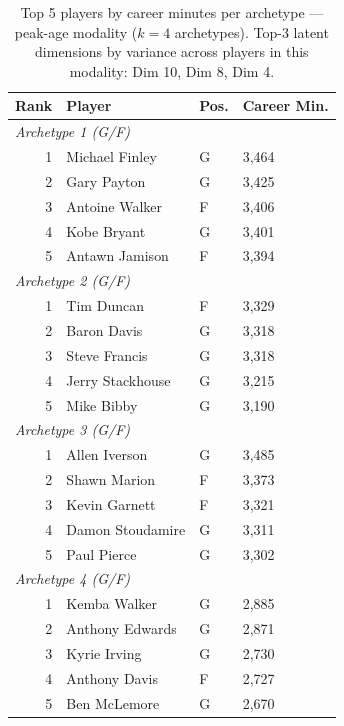 \begin{table}[htbp]
  \centering\small
  \begin{tabular}{rlll}
    \toprule
    Rank & Player & Pos. & Career Min. \\
    \midrule
    \multicolumn{4}{l}{\textit{Archetype 1 (G/F)}} \\
    \midrule
    1 & Michael Finley & G & 3,464 \\
    2 & Gary Payton & G & 3,425 \\
    3 & Antoine Walker & F & 3,406 \\
    4 & Kobe Bryant & G & 3,401 \\
    5 & Antawn Jamison & F & 3,394 \\
    \midrule[0.4pt]
    \multicolumn{4}{l}{\textit{Archetype 2 (G/F)}} \\
    \midrule
    1 & Tim Duncan & F & 3,329 \\
    2 & Baron Davis & G & 3,318 \\
    3 & Steve Francis & G & 3,318 \\
    4 & Jerry Stackhouse & G & 3,215 \\
    5 & Mike Bibby & G & 3,190 \\
    \midrule[0.4pt]
    \multicolumn{4}{l}{\textit{Archetype 3 (G/F)}} \\
    \midrule
    1 & Allen Iverson & G & 3,485 \\
    2 & Shawn Marion & F & 3,373 \\
    3 & Kevin Garnett & F & 3,321 \\
    4 & Damon Stoudamire & G & 3,311 \\
    5 & Paul Pierce & G & 3,302 \\
    \midrule[0.4pt]
    \multicolumn{4}{l}{\textit{Archetype 4 (G/F)}} \\
    \midrule
    1 & Kemba Walker & G & 2,885 \\
    2 & Anthony Edwards & G & 2,871 \\
    3 & Kyrie Irving & G & 2,730 \\
    4 & Anthony Davis & F & 2,727 \\
    5 & Ben McLemore & G & 2,670 \\
    \bottomrule
  \end{tabular}
  \caption{Top 5 players by career minutes per archetype --- peak-age modality ($k=4$ archetypes). Top-3 latent dimensions by variance across players in this modality: Dim 10, Dim 8, Dim 4.}
  \label{tab:arch_reps_peak_age}
\end{table}


